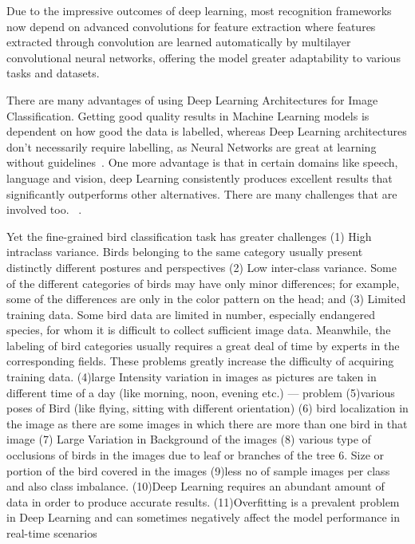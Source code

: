 \documentclass[a4paper,12pt]{article}
\begin{document}
Due to the impressive outcomes of deep learning, most recognition frameworks now depend on advanced convolutions for feature extraction where features extracted through convolution are learned automatically by multilayer convolutional neural networks, offering the model greater adaptability to various tasks and datasets\citep{Lu2024}.

There are many advantages of using Deep Learning Architectures for Image Classification. Getting good quality results in Machine Learning models is dependent on how good the data is labelled, whereas Deep Learning architectures don’t necessarily require labelling, as Neural Networks are great at learning without guidelines~\cite{source5}. One more advantage is that in certain domains like speech, language and vision, deep Learning consistently produces excellent results that significantly outperforms other alternatives. There are many challenges that are involved too.  ~\citep{source6}.

Yet the fine-grained bird classification task has greater challenges \citep{ani13020264}
(1) High intraclass variance. Birds belonging to the same category usually present distinctly different postures and perspectives
(2) Low inter-class variance. Some of the different categories of birds may have only minor differences; for example, some of the differences are only in the color pattern on the head; and 
(3) Limited training data. Some bird data are limited in number, especially endangered species, for whom it is difficult to collect sufficient image data. Meanwhile, the labeling of bird categories usually requires a great deal of time by experts in the corresponding fields. These problems greatly increase the difficulty of acquiring training data.
(4)large Intensity variation in images as pictures are taken in different time of a day (like morning, noon, evening etc.) — problem
(5)various poses of Bird (like flying, sitting with different orientation)
(6) bird localization in the image as there are some images in which there are more than one bird in that image
(7) Large Variation in Background of the images
(8) various type of occlusions of birds in the images due to leaf or branches of the tree 6. Size or portion of the bird covered in the images 
(9)less no of sample images per class and also class imbalance.\citep{10.1007/978-981-15-1387-9_3}
(10)Deep Learning requires an abundant amount of data in order to produce accurate results.
(11)Overfitting is a prevalent problem in Deep Learning and can sometimes negatively affect the model performance in real-time scenarios
\end{document}
